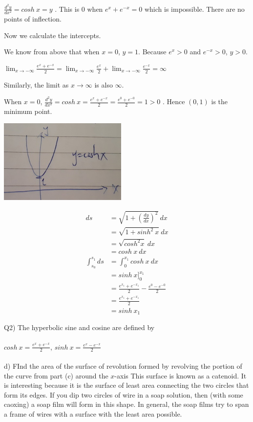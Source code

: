 \documentclass[9pt]{article}
\begin{document}
$\frac{d^2 y}{dx^2} = cosh\ x = y$ . This is $0$ when $e^x + e^{-x} = 0$ which is impossible. There are no points of inflection.

Now we calculate the intercepts.

We know from above that when $x = 0$, $y = 1$. Because $e^x > 0$ and $e^{-x} > 0$, $y > 0$.

$\lim_{x \to -\infty} \frac{e^x + e^{-x}}{2} = \lim_{x \to -\infty} \frac{e^x}{2} + \lim_{x \to -\infty} \frac{e^{-x}}{2} = \infty$

Similarly, the limit as $x \to \infty$ is also $\infty$.

When $x = 0$, $\frac{d^2 y}{dx^2} = cosh \ x = \frac{e^x + e^{-x}}{2} = \frac{e^0 + e^{-0}}{2} = 1 > 0$ . Hence $(0, 1)$ is the minimum point.

\begin{center}
  \includegraphics[scale=0.8]{2c.jpg}
\end{center}

\begin{align*}
  ds &= \sqrt{1 + (\frac{dy}{dx})^2} \ dx \\
  &= \sqrt{1 + sinh^2 \ x} \ dx \\
  &= \sqrt{cosh^2 x} \ dx \\
  &= cosh \ x \ dx
  \\
  \int_{s_0}^{s_1} ds &= \int_0^{x_1} cosh \ x \ dx \\
  &= sinh \ x \bigg]_0^{x_1} \\
  &= \frac{e^{x_1} + e^{-x_1}}{2} - \frac{e^0 - e^{-0}}{2} \\
  &= \frac{e^{x_1} + e^{-x_1}}{2} \\
  &= sinh \ x_1
\end{align*}


\begin{tcolorbox}
  Q2) The hyperbolic sine and cosine are defined by \\
  \\
  $cosh \ x = \frac{e^x + e^{-x}}{2}$, $sinh \ x = \frac{e^x - e^{-x}}{2}$ \\
  \\
  d) FInd the area of the surface of revolution formed by revolving the portion of the curve from part (c) around the $x$-axis This surface is known as a catenoid. It is interesting because it is the surface of least area connecting the two circles that form its edges. If you dip two circles of wire in a soap solution, then (with some caoxing) a soap film will form in this shape. In general, the soap films try to span a frame of wires with a surface with the least area possible.
\end{tcolorbox}
\end{document}
